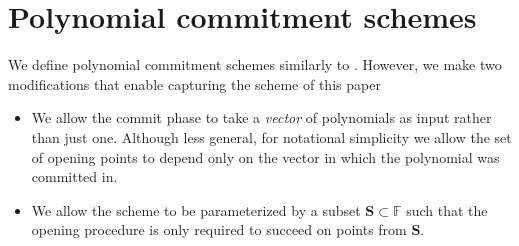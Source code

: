 \documentclass[11pt]{article} %
\newcommand{\F}{\ensuremath{\mathbb F}\xspace}
\newcommand{\openset}{\ensuremath{\mathbf{S}}\xspace}
\begin{document}
\section{Polynomial commitment schemes}\label{subsec:PCS}
We define polynomial commitment schemes similarly to \cite{plonk,shplonk}.
However, we make two modifications that enable capturing the scheme of this paper
 \begin{itemize}
  \item We allow the commit phase to take a \emph{vector} of polynomials as input rather than just one.
Although less general, for notational simplicity we allow the set of opening points to depend only on the vector in which the polynomial was committed in.
  \item We allow the scheme to be parameterized by a subset $\openset\subset \F$ such that the opening procedure is only required to succeed on points from $\openset$.
 \end{itemize}
\end{document}
